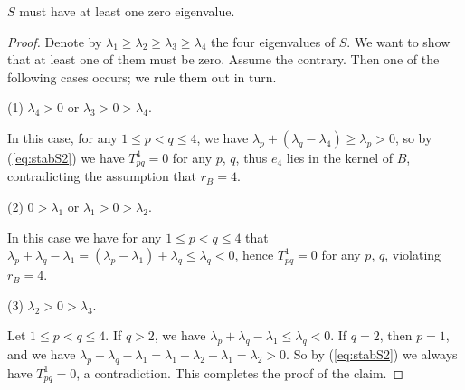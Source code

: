 \documentclass{amsart}
\begin{document}
 $S$ must have at least one zero eigenvalue.
\begin{proof}
Denote by $\lambda_1\geq \lambda_2\geq \lambda_3\geq  \lambda_4$ the four eigenvalues of $S$. We want to show that at least one of them must be zero. Assume the contrary. Then one of the following cases occurs; we rule them out in turn.

\vspace{0.1cm}
(1) $\lambda_4>0$ or $\lambda_3> 0 > \lambda_4$.

In this case, for any $1\leq p<q\leq 4$, we have $\lambda_p+(\lambda_q-\lambda_4)\geq \lambda_p>0$, so by (\ref{eq:stabS2}) we have $T^4_{pq}=0$ for any $p$, $q$, thus $e_4$ lies in the kernel of $B$, contradicting the assumption that $r_B=4$.

\vspace{0.1cm}
(2) $0>\lambda_1$ or $\lambda_1 > 0>\lambda_2$.

In this case we have for any $1\leq p<q\leq 4$ that
$\lambda_p+\lambda_q-\lambda_1 = (\lambda_p -\lambda_1) + \lambda_q \leq \lambda_q <0$, hence $T^1_{pq}=0$ for any $p$, $q$, violating $r_B=4$.

\vspace{0.1cm}
(3) $\lambda_2> 0 > \lambda_3$.

Let $1\leq p<q\leq 4$. If $q>2$, we have $\lambda_p+\lambda_q-\lambda_1\leq \lambda_q <0$. If $q=2$, then $p=1$, and we have $\lambda_p+\lambda_q-\lambda_1= \lambda_1+\lambda_2-\lambda_1 = \lambda_2 >0$. So by (\ref{eq:stabS2}) we always have $T^1_{pq}=0$, a contradiction. This completes the proof of the claim.
\end{proof}


\vspace{0.25cm}
\end{document}
